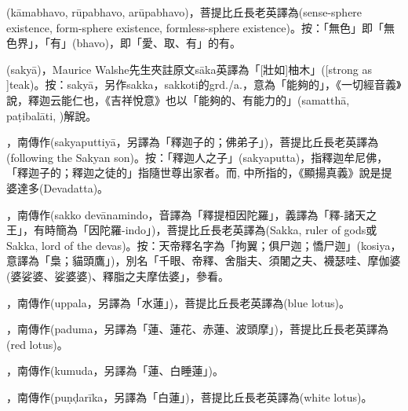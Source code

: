\startitemgroup[noteitems]
\item{}(kāmabhavo, rūpabhavo, arūpabhavo)，菩提比丘長老英譯為(sense-sphere existence, form-sphere existence, formless-sphere existence)。按：「無色」即「無色界」，「有」(bhavo)，即「愛、取、有」的有。
\stopitemgroup

\startitemgroup[noteitems]
\item{}(sakyā)，Maurice Walshe先生夾註原文sāka英譯為「[壯如]柚木」([strong as ]teak)。按：sakyā，另作sakka，sakkoti的grd./a.，意為「能夠的」，《一切經音義》說，釋迦云能仁也，《吉祥悅意》也以「能夠的、有能力的」(samatthā, paṭibalāti, )解說。
\item{}，南傳作(sakyaputtiyā，另譯為「釋迦子的；佛弟子」)，菩提比丘長老英譯為(following the Sakyan son)。按：「釋迦人之子」(sakyaputta)，指釋迦牟尼佛，「釋迦子的；釋迦之徒的」指隨世尊出家者。而, 中所指的，《顯揚真義》說是提婆達多(Devadatta)。
\stopitemgroup

\startitemgroup[noteitems]
\item{}，南傳作(sakko devānamindo，音譯為「釋提桓因陀羅」，義譯為「釋-諸天之王」，有時簡為「因陀羅-indo」)，菩提比丘長老英譯為(Sakka, ruler of gods或Sakka, lord of the devas)。按：天帝釋名字為「拘翼；俱尸迦；憍尸迦」(kosiya，意譯為「梟；貓頭鷹」)，別名「千眼、帝釋、舍脂夫、須闍之夫、襪瑟哇、摩伽婆(婆娑婆、娑婆婆)、釋脂之夫摩佉婆」，參看。
\stopitemgroup

\startitemgroup[noteitems]
\item{}，南傳作(uppala，另譯為「水蓮」)，菩提比丘長老英譯為(blue lotus)。
\item{}，南傳作(paduma，另譯為「蓮、蓮花、赤蓮、波頭摩」)，菩提比丘長老英譯為(red lotus)。
\item{}，南傳作(kumuda，另譯為「蓮、白睡蓮」)。
\item{}，南傳作(puṇḍarīka，另譯為「白蓮」)，菩提比丘長老英譯為(white lotus)。
\stopitemgroup

